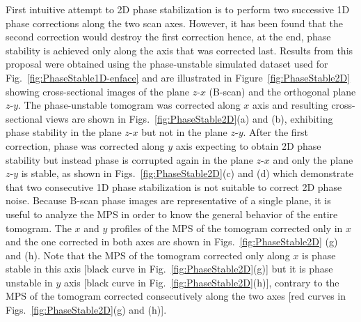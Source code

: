 First intuitive attempt to 2D phase stabilization is to perform two successive 1D phase corrections along the two scan axes. However, it has been found that the second correction would destroy the first correction hence, at the end, phase stability is achieved only along the axis that was corrected last. Results from this proposal were obtained using the phase-unstable simulated dataset used for Fig.~\ref{fig:PhaseStable1D-enface} and are illustrated in Figure~\ref{fig:PhaseStable2D} showing cross-sectional images of the plane $z$-$x$ (B-scan) and the orthogonal plane $z$-$y$. The phase-unstable tomogram was corrected along $x$ axis and resulting cross-sectional views are shown in Figs.~\ref{fig:PhaseStable2D}(a) and (b), exhibiting phase stability in the plane $z$-$x$ but not in the plane $z$-$y$. After the first correction, phase was corrected along $y$ axis expecting to obtain 2D phase stability but instead phase is corrupted again in the plane $z$-$x$ and only the plane $z$-$y$ is stable, as shown in Figs.~\ref{fig:PhaseStable2D}(c) and (d) which demonstrate that two consecutive 1D phase stabilization is not suitable to correct 2D phase noise. Because B-scan phase images are representative of a single plane, it is useful to analyze the MPS in order to know the general behavior of the entire tomogram. The $x$ and $y$ profiles of the MPS of the tomogram corrected only in $x$ and the one corrected in both axes are shown in Figs.~\ref{fig:PhaseStable2D} (g) and (h). Note that the MPS of the tomogram corrected only along $x$ is phase stable in this axis [black curve in Fig.~\ref{fig:PhaseStable2D}(g)] but it is phase unstable in $y$ axis [black curve in Fig.~\ref{fig:PhaseStable2D}(h)], contrary to the MPS of the tomogram corrected consecutively along the two axes [red curves in Figs.~\ref{fig:PhaseStable2D}(g) and (h)].


